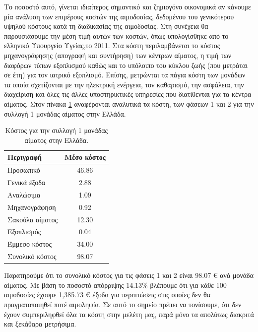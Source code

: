 		Το ποσοστό αυτό, γίνεται ιδιαίτερος σημαντικό και ζημιογόνο οικονομικά αν κάνουμε μία ανάλυση των επιμέρους κοστών της αιμοδοσίας, δεδομένου του γενικότερου υψηλού κόστους κατά τη διαδικασίας της αιμοδοσίας. Στη συνέχεια θα παρουσιάσουμε την μέση τιμή αυτών των κοστών, όπως υπολογίσθηκε από το ελληνικό Υπουργείο Υγείας,το 2011\cite{Fragoulakis}. Στα κόστη περιλαμβάνεται το κόστος μηχανογράφησης (απογραφή και συντήρηση) των κέντρων αίματος, η τιμή των διαφόρων τύπων εξοπλισμού καθώς και το υπόλοιπο του κύκλου ζωής (που μετράται σε έτη) για τον ιατρικό εξοπλισμό. Επίσης, μετρώνται τα πάγια κόστη των μονάδων τα οποία σχετίζονται με την ηλεκτρική ενέργεια,  τον καθαρισμό, την ασφάλεια, την διαχείριση και όλες τις άλλες υποστηρικτικές υπηρεσίες που διατίθενται για τα κέντρα αίματος. Στον πίνακα \ref{tab:blood_collection_cost_greece} αναφέρονται αναλυτικά τα κόστη, των φάσεων 1 και 2 για την συλλογή 1 μονάδας αίματος στην Ελλάδα.
		
	\begin{table}[h]
		\centering
		\begin{tabular}{|l|c|}
		    \hline
		    \rowcolor{grayy}
		    \textbf{Περιγραφή} & \textbf{Μέσο κόστος}
		    \\ \hline
		     Προσωπικό & 46.86
		     \\ 
		     Γενικά έξοδα & 2.88
		     \\ 
		     Αναλώσιμα & 1.09
		     \\ 
		     Μηχανογράφηση & 0.92
		     \\
		     Σακούλα αίματος & 12.30
		     \\
		     Εξοπλισμός & 0.04
		     \\ 
		     Έμμεσο κόστος & 34.00
		     \\ \hline
		     Συνολικό κόστος & 98.07	
		     \\ \hline
		\end{tabular}
		\caption{Κόστος για την συλλογή 1 μονάδας αίματος στην Ελλάδα.}
		\label{tab:blood_collection_cost_greece}
	\end{table}
		
		Παρατηρούμε ότι το συνολικό κόστος για τις φάσεις 1 και 2 είναι 98.07 € ανά μονάδα αίματος.  Με βάση το ποσοστό απόρριψης 14.13\% βλέπουμε ότι για κάθε 100 αιμοδοσίες έχουμε 1,385.73 € έξοδα για περιπτώσεις στις οποίες δεν θα πραγματοποιηθεί ποτέ αιμοληψία. Σε αυτό το σημείο πρέπει να τονίσουμε, ότι δεν έχουν συμπεριληφθεί όλα τα κόστη στην μελέτη μας, παρά μόνο τα απολύτως διακριτά και ξεκάθαρα μετρήσιμα.
	
